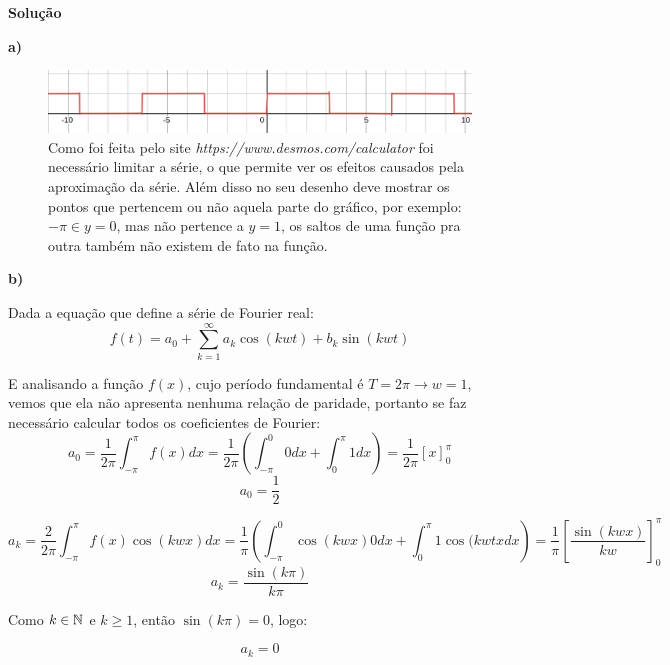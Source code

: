 \linespread{1.5}
\textbf{Solução}
    
\textbf{a)}
\begin{figure}[H]
    \centering
    \includegraphics[width = 0.7\linewidth]{fig/sf4a.png}
    \caption{Como foi feita pelo site \textit{https://www.desmos.com/calculator} foi necessário limitar a série, o que permite ver os efeitos causados pela aproximação da série. Além disso no seu desenho deve mostrar os pontos que pertencem ou não aquela parte do gráfico, por exemplo: $-\pi \in y=0$, mas não pertence a $y=1$, os saltos de uma função pra outra também não existem de fato na função.}
\end{figure}

\textbf{b)}

Dada a equação que define a série de Fourier real:
\begin{equation}
    \label{eq:Fourierserie}
    f(t) = a_0 + \sum_{k=1}^\infty a_k\cos{(kwt)} + b_k\sin{(kwt)}
\end{equation}

E analisando a função $f(x)$, cujo período fundamental é $T=2\pi \xrightarrow{} w=1$, vemos que ela não apresenta nenhuma relação de paridade, portanto se faz necessário calcular todos os coeficientes de Fourier:
\begin{equation*}
    a_0 = \frac{1}{2\pi}\int_{-\pi}^\pi f(x)dx = \frac{1}{2\pi} \left( \int_{-\pi}^0 0dx + \int_0^\pi 1dx \right) = \frac{1}{2\pi}[x]_0^\pi
\end{equation*}
\begin{equation}
    \label{eq:sf4ba0}
    a_0 = \frac{1}{2}
\end{equation}

\begin{equation*}
    a_k = \frac{2}{2\pi}\int_{-\pi}^\pi f(x)\cos{(kwx)}dx = \frac{1}{\pi}\left(\int_{-\pi}^0\cos{(kwx)} 0dx + \int_0^\pi 1\cos{(kwtx}dx\right) = \frac{1}{\pi}\left[\frac{\sin{(kwx)}}{kw}\right]^\pi_0
\end{equation*}
\begin{equation}
    a_k = \frac{\sin{(k\pi)}}{k\pi}
\end{equation}

Como $k \in \mathbb{N}$ e $k\geq1$, então $\sin{(k\pi)}=0$, logo:

\begin{equation}
    \label{eq:sf4bak}
    a_k = 0
\end{equation}


